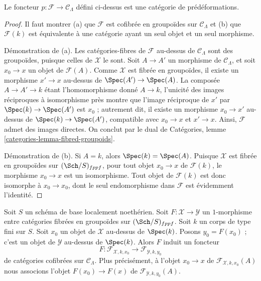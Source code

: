 \begin{lemma}
\label{lemma-predeformation-category}
Le foncteur $p : \mathcal{F} \to \mathcal{C}_\Lambda$ défini ci-dessus est
une catégorie de prédéformations.
\end{lemma}

\begin{proof}
Il faut montrer (a) que $\mathcal{F}$ est cofibrée en groupoïdes sur
$\mathcal{C}_\Lambda$ et (b) que $\mathcal{F}(k)$ est équivalente à une
catégorie ayant un seul objet et un seul morphisme.

\medskip\noindent
Démonstration de (a). Les catégories-fibres de $\mathcal{F}$ au-dessus de
$\mathcal{C}_\Lambda$ sont des groupoïdes, puisque celles de $\mathcal{X}$ le
sont. Soit $A \to A'$ un morphisme de $\mathcal{C}_\Lambda$, et soit
$x_0 \to x$ un objet de $\mathcal{F}(A)$. Comme $\mathcal{X}$ est fibrée en
groupoïdes, il existe un morphisme $x' \to x$ au-dessus de
$\Spec(A') \to \Spec(A)$. La composée $A \to A' \to k$ étant l'homomorphisme
donné $A \to k$, l'unicité des images réciproques à isomorphisme près montre
que l'image réciproque de $x'$ par $\Spec(k) \to \Spec(A')$ est $x_0$ ;
autrement dit, il existe un morphisme $x_0 \to x'$ au-dessus de
$\Spec(k) \to \Spec(A')$, compatible avec $x_0 \to x$ et $x' \to x$.
Ainsi, $\mathcal{F}$ admet des images directes. On conclut par le dual de
Catégories, lemme \ref{categories-lemma-fibred-groupoids}.

\medskip\noindent
Démonstration de (b). Si $A = k$, alors $\Spec(k) = \Spec(A)$. Puisque
$\mathcal{X}$ est fibrée en groupoïdes sur $(\Sch/S)_{fppf}$, pour tout objet
$x_0 \to x$ de $\mathcal{F}(k)$, le morphisme $x_0 \to x$ est un
isomorphisme. Tout objet de $\mathcal{F}(k)$ est donc isomorphe à
$x_0 \to x_0$, dont le seul endomorphisme dans $\mathcal{F}$ est évidemment
l'identité.
\end{proof}

\noindent
Soit $S$ un schéma de base localement noethérien. Soit
$F : \mathcal{X} \to \mathcal{Y}$ un $1$-morphisme entre catégories fibrées
en groupoïdes sur $(\Sch/S)_{fppf}$. Soit $k$ un corps de type fini sur $S$.
Soit $x_0$ un objet de $\mathcal{X}$ au-dessus de $\Spec(k)$. Posons
$y_0 = F(x_0)$ ; c'est un objet de $\mathcal{Y}$ au-dessus de $\Spec(k)$.
Alors $F$ induit un foncteur
\begin{equation}
\label{equation-functoriality}
F :
\mathcal{F}_{\mathcal{X}, k, x_0}
\longrightarrow
\mathcal{F}_{\mathcal{Y}, k, y_0}
\end{equation}
de catégories cofibrées sur $\mathcal{C}_\Lambda$. Plus précisément, à l'objet
$x_0 \to x$ de $\mathcal{F}_{\mathcal{X}, k, x_0}(A)$ nous associons l'objet
$F(x_0) \to F(x)$ de $\mathcal{F}_{\mathcal{Y}, k, y_0}(A)$.

